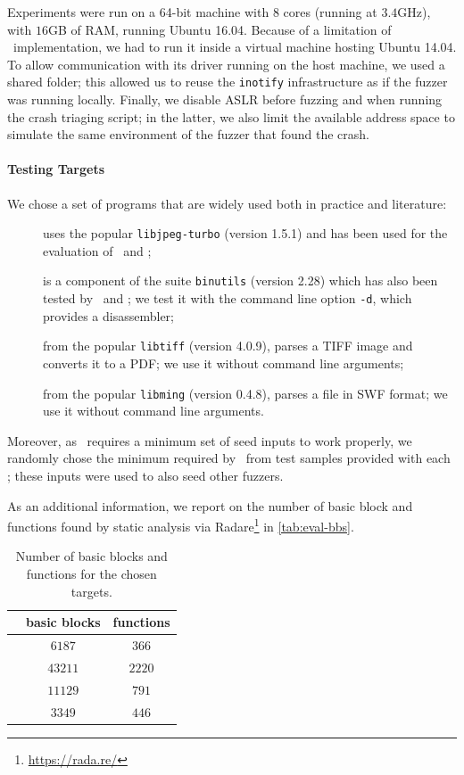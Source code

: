 Experiments were run on a 64-bit machine with $8$ cores (running at $3.4$GHz),
with $16$GB of RAM, running Ubuntu 16.04. Because of a limitation of \vuzzer\
implementation, we had to run it inside a virtual machine hosting Ubuntu 14.04.
To allow communication with its driver running on the host machine, we used a
shared folder; this allowed us to reuse the \texttt{inotify} infrastructure as
if the fuzzer was running locally. Finally, we disable \ac{ASLR} before fuzzing
and when running the crash triaging script; in the latter, we also limit the
available address space to simulate the same environment of the fuzzer that
found the crash.

\paragraph{Testing Targets}

We chose a set of programs that are widely used both in practice and literature:

\begin{description}
    \item[\djpeg] uses the popular \texttt{libjpeg-turbo} (version 1.5.1) and
        has been used for the evaluation of \fairfuzz\ and \vuzzer;
    \item[\objdump] is a component of the suite \texttt{binutils} (version 2.28)
        which has also been tested by \aflfast\ and \fairfuzz; we test it with
        the command line option \texttt{-d}, which provides a disassembler;
    \item[\tiffpdf] from the popular \texttt{libtiff} (version 4.0.9), parses a
        TIFF image and converts it to a PDF\@; we use it without command line
        arguments;
    \item[\listswf] from the popular \texttt{libming} (version 0.4.8), parses a
        file in SWF format; we use it without command line arguments.
\end{description}

Moreover, as \vuzzer\ requires a minimum set of seed inputs to work properly,
we randomly chose the minimum required by \vuzzer\ from test samples provided
with each \sut; these inputs were used to also seed other fuzzers.

As an additional information, we report on the number of basic block and
functions found by static analysis via Radare\footnote{\url{https://rada.re/}}
in \autoref{tab:eval-bbs}.

\begin{table}[h]
    \centering%
    \begin{tabular}{l c c}
        \textbf{\sut} & \textbf{basic blocks} & \textbf{functions} \\
        \bottomrule%
        \djpeg& $6187$ & $366$ \\
        \objdump& $43211$ & $2220$ \\
        \tiffpdf& $11129$ & $791$ \\
        \listswf& $3349$ & $446$
    \end{tabular}
    \caption{Number of basic blocks and functions for the chosen targets.}
    \label{tab:eval-bbs}
\end{table}

